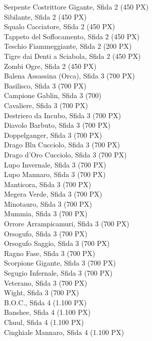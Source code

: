 \begin{multicols}{3}
{		Serpente Costrittore Gigante, Sfida 2 (450 PX)\\
		Sibilante, Sfida 2 (450 PX)\\
		Squalo Cacciatore, Sfida 2 (450 PX)\\
		Tappeto del Soffocamento, Sfida 2 (450 PX)\\
		Teschio Fiammeggiante, Sfida 2 (200 PX)\\
		Tigre dai Denti a Sciabola, Sfida 2 (450 PX)\\
		Zombi Ogre, Sfida 2 (450 PX)\\
		Balena Assassina (Orca), Sfida 3 (700 PX)\\
		Basilisco, Sfida 3 (700 PX)\\
		Campione Gablin, Sfida 3 (700)\\
		Cavaliere, Sfida 3 (700 PX)\\
		Destriero da Incubo, Sfida 3 (700 PX)\\
		Diavolo Barbuto, Sfida 3 (700 PX)\\
		Doppelganger, Sfida 3 (700 PX)\\
		Drago Blu Cucciolo, Sfida 3 (700 PX)\\
		Drago d'Oro Cucciolo, Sfida 3 (700 PX)\\
		Lupo Invernale, Sfida 3 (700 PX)\\
		Lupo Mannaro, Sfida 3 (700 PX)\\
		Manticora, Sfida 3 (700 PX)\\
		Megera Verde, Sfida 3 (700 PX)\\
		Minotauro, Sfida 3 (700 PX)\\
		Mummia, Sfida 3 (700 PX)\\
		Orrore Arrampicamuri, Sfida 3 (700 PX)\\
		Orsogufo, Sfida 3 (700 PX)\\
		Orsogufo Saggio, Sfida 3 (700 PX)\\
		Ragno Fase, Sfida 3 (700 PX)\\
		Scorpione Gigante, Sfida 3 (700 PX)\\
		Segugio Infernale, Sfida 3 (700 PX)\\
		Veterano, Sfida 3 (700 PX)\\
		Wight, Sfida 3 (700 PX)\\
		B.O.C., Sfida 4 (1.100 PX)\\
		Banshee, Sfida 4 (1.100 PX)\\
		Chuul, Sfida 4 (1.100 PX)\\
		Cinghiale Mannaro, Sfida 4 (1.100 PX)\\
}
\end{multicols}
